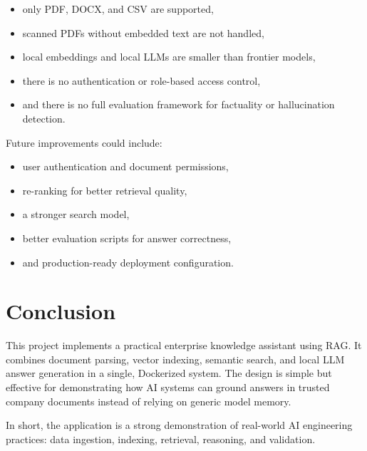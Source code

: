 \documentclass[11pt,a4paper]{article}
\begin{document}
\begin{itemize}[leftmargin=1.5em]
    \item only PDF, DOCX, and CSV are supported,
    \item scanned PDFs without embedded text are not handled,
    \item local embeddings and local LLMs are smaller than frontier models,
    \item there is no authentication or role-based access control,
    \item and there is no full evaluation framework for factuality or hallucination detection.
\end{itemize}

Future improvements could include:

\begin{itemize}[leftmargin=1.5em]
    \item user authentication and document permissions,
    \item re-ranking for better retrieval quality,
    \item a stronger search model,
    \item better evaluation scripts for answer correctness,
    \item and production-ready deployment configuration.
\end{itemize}

\section{Conclusion}
This project implements a practical enterprise knowledge assistant using RAG. It combines document parsing, vector indexing, semantic search, and local LLM answer generation in a single, Dockerized system. The design is simple but effective for demonstrating how AI systems can ground answers in trusted company documents instead of relying on generic model memory.

In short, the application is a strong demonstration of real-world AI engineering practices: data ingestion, indexing, retrieval, reasoning, and validation.
\end{document}
